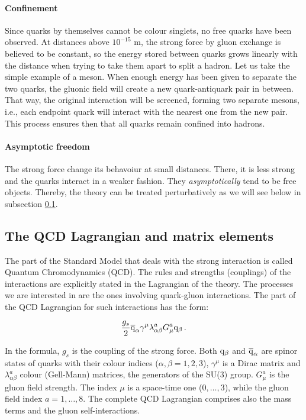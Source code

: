 \documentclass[a4paper,12pt]{article}
\begin{document}
\paragraph{Confinement} Since quarks by themselves cannot be colour singlets, no free quarks have been observed. At distances above $10^{-15}$ m, the strong force by gluon exchange is believed to be constant, so the energy stored between quarks grows linearly with the distance when trying to take them apart to split a hadron. Let us take the simple example of a meson. When enough energy has been given to separate the two quarks, the gluonic field will create a new quark-antiquark pair in between. That way, the original interaction will be screened, forming two separate mesons, i.e., each endpoint quark will interact with the nearest one from the new pair. This process ensures then that all quarks remain confined into hadrons.

\paragraph{Asymptotic freedom} The strong force change its behavoiur at small distances. There, it is less strong and the quarks interact in a weaker fashion. They \textit{asymptotically} tend to be free objects. Thereby, the theory can be treated perturbatively as we will see below in subsection \ref{subsec:QCDLag}. 


\subsection{The QCD Lagrangian and matrix elements}
\label{subsec:QCDLag}

The part of the Standard Model that deals with the strong interaction is called Quantum Chromodynamics (QCD). The rules and strengths (couplings) of the interactions are explicitly stated in the Lagrangian of the theory. The processes we are interested in are the ones involving quark-gluon interactions. The part of the QCD Lagrangian for such interactions has the form\cite{Kane:1993}:

 \begin{equation}
  \frac{g_s}2 \overline{\mathrm q}_\alpha \gamma^\mu \lambda^a_{\alpha \beta} G_\mu^a {\mathrm q}_\beta\label{eq:QCDLag}
  \, .
\end{equation}

In the formula, $g_s$ is the coupling of the strong force. Both ${\mathrm q}_\beta$ and $\overline{\mathrm q}_\alpha$ are spinor states of quarks with their colour indices ($\alpha,\beta = 1,2,3$), $\gamma^\mu$ is a Dirac matrix and $\lambda^a_{\alpha \beta}$ colour (Gell-Mann) matrices, the generators of the SU(3) group. $G_\mu^a$ is the gluon field strength. The index $\mu$ is a space-time one ($0,\dots,3$), while the gluon field index $a=1,\dots,8$. The complete QCD Lagrangian comprises also the mass terms and the gluon self-interactions.
\end{document}
